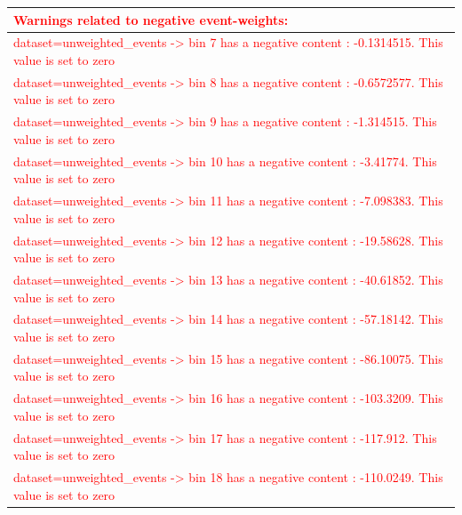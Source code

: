 \documentclass[a4paper, 10pt]{article}
\begin{document}
\begin{table}[H]
  \begin{center}
    \begin{tabular}{|m{140.0mm}|}
      \hline
      {\cellcolor{white}\textcolor{red}{Warnings related to negative event-weights:}}\\
      \hline
      {\cellcolor{white}\textcolor{red}{dataset=unweighted\_events -> bin 7 has a negative content : -0.1314515. This value is set to zero}}\\
      \hline
      {\cellcolor{white}\textcolor{red}{dataset=unweighted\_events -> bin 8 has a negative content : -0.6572577. This value is set to zero}}\\
      \hline
      {\cellcolor{white}\textcolor{red}{dataset=unweighted\_events -> bin 9 has a negative content : -1.314515. This value is set to zero}}\\
      \hline
      {\cellcolor{white}\textcolor{red}{dataset=unweighted\_events -> bin 10 has a negative content : -3.41774. This value is set to zero}}\\
      \hline
      {\cellcolor{white}\textcolor{red}{dataset=unweighted\_events -> bin 11 has a negative content : -7.098383. This value is set to zero}}\\
      \hline
      {\cellcolor{white}\textcolor{red}{dataset=unweighted\_events -> bin 12 has a negative content : -19.58628. This value is set to zero}}\\
      \hline
      {\cellcolor{white}\textcolor{red}{dataset=unweighted\_events -> bin 13 has a negative content : -40.61852. This value is set to zero}}\\
      \hline
      {\cellcolor{white}\textcolor{red}{dataset=unweighted\_events -> bin 14 has a negative content : -57.18142. This value is set to zero}}\\
      \hline
      {\cellcolor{white}\textcolor{red}{dataset=unweighted\_events -> bin 15 has a negative content : -86.10075. This value is set to zero}}\\
      \hline
      {\cellcolor{white}\textcolor{red}{dataset=unweighted\_events -> bin 16 has a negative content : -103.3209. This value is set to zero}}\\
      \hline
      {\cellcolor{white}\textcolor{red}{dataset=unweighted\_events -> bin 17 has a negative content : -117.912. This value is set to zero}}\\
      \hline
      {\cellcolor{white}\textcolor{red}{dataset=unweighted\_events -> bin 18 has a negative content : -110.0249. This value is set to zero}}\\

\end{tabular}
\end{center}
\end{table}
\end{document}
